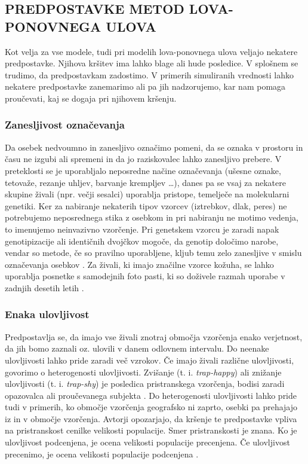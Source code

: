 \subsection{PREDPOSTAVKE METOD LOVA-PONOVNEGA ULOVA}
Kot velja za vse modele, tudi pri modelih lova-ponovnega ulova veljajo nekatere predpostavke. Njihova kršitev ima lahko blage ali hude posledice. V splošnem se trudimo, da predpostavkam zadostimo. V primerih simuliranih vrednosti lahko nekatere predpostavke zanemarimo ali pa jih nadzorujemo, kar nam pomaga proučevati, kaj se dogaja pri njihovem kršenju.

\subsubsection[\bfseries Zanesljivost označevanja]{Zanesljivost označevanja}
Da osebek nedvoumno in zanesljivo označimo pomeni, da se oznaka v prostoru in času ne izgubi ali spremeni in da jo raziskovalec lahko zanesljivo prebere. V preteklosti se je uporabljalo neposredne načine označevanja (ušesne oznake, tetovaže, rezanje uhljev, barvanje krempljev …), danes pa se vsaj za nekatere skupine živali (npr. večji sesalci) uporablja pristope, temelječe na molekularni genetiki. Ker za nabiranje nekaterih tipov vzorcev (iztrebkov, dlak, peres) ne potrebujemo neposrednega stika z osebkom in pri nabiranju ne motimo vedenja, to imenujemo neinvazivno vzorčenje. Pri genetskem vzorcu je zaradi napak genotipizacije ali identičnih dvojčkov mogoče, da genotip določimo narobe, vendar so metode, če so pravilno uporabljene, kljub temu zelo zanesljive v smislu označevanja osebkov \citep{waits_noninvasive_2005}. Za živali, ki imajo značilne vzorce kožuha, se lahko uporablja posnetke s samodejnih foto pasti, ki so doživele razmah uporabe v zadnjih desetih letih \citep{oconnell_camera_2010}.

\subsubsection[\bfseries Enaka ulovljivost]{Enaka ulovljivost}
Predpostavlja se, da imajo vse živali znotraj območja vzorčenja enako verjetnost, da jih bomo zaznali oz. ulovili v danem odlovnem intervalu. Do neenake ulovljivosti lahko pride zaradi več vzrokov. Če imajo živali različne ulovljivosti, govorimo o heterogenosti ulovljivosti. Zvišanje (t. i. \textit{trap-happy}) ali znižanje ulovljivosti (t. i. \textit{trap-shy}) je posledica pristranskega vzorčenja, bodisi zaradi opazovalca ali proučevanega subjekta \citep{roche_recapture_2013}. Do heterogenosti ulovljivosti lahko pride tudi v primerih, ko območje vzorčenja geografsko ni zaprto, osebki pa prehajajo iz in v območje vzorčenja. Avtorji opozarjajo, da kršenje te predpostavke vpliva na pristranskost cenilke velikosti populacije. Smer pristranskosti je znana. Ko je ulovljivost podcenjena, je ocena velikosti populacije precenjena. Če ulovljivost precenimo, je ocena velikosti populacije podcenjena \citep{williams_analysis_2002}.

